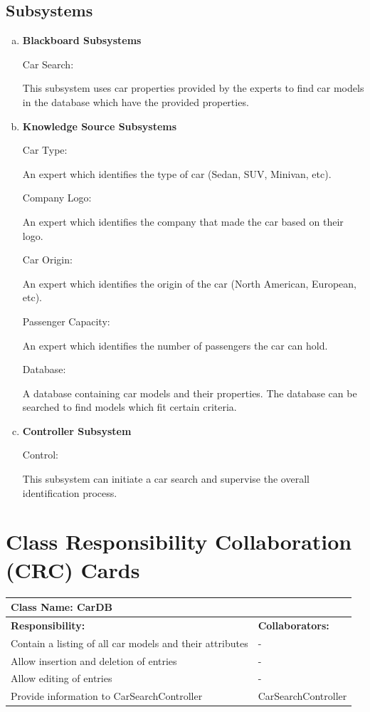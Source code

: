 \documentclass[12pt]{article}
\begin{document}
\subsection{Subsystems}
\label{sub:subsystems}
\begin{enumerate}[a)]
	\item {\textbf{Blackboard Subsystems}}
	\par Car Search:
	\par This subsystem uses car properties provided by the experts to find car models in the database which have the provided properties.
	\item {\textbf{Knowledge Source Subsystems}}
	\par Car Type:
	\par An expert which identifies the type of car (Sedan, SUV, Minivan, etc).
	\par Company Logo:
	\par An expert which identifies the company that made the car based on their logo.
	\par Car Origin:
	\par An expert which identifies the origin of the car (North American, European, etc).
	\par Passenger Capacity:
	\par An expert which identifies the number of passengers the car can hold.
	\par Database:
	\par A database containing car models and their properties. The database can be searched to find models which fit certain criteria.
	\item {\textbf{Controller Subsystem}}
	\par Control:
	\par This subsystem can initiate a car search and supervise the overall identification process.
\end{enumerate}


\section{Class Responsibility Collaboration (CRC) Cards}
\label{sec:class_responsibility_collaboration_crc_cards}

	\begin{table}[ht]
		\centering
		\begin{tabular}{|p{5cm}|p{5cm}|}
		\hline
		 \multicolumn{2}{|l|}{\textbf{Class Name:} CarDB} \\
		\hline
		\textbf{Responsibility:} & \textbf{Collaborators:} \\
		\hline
		Contain a listing of all car models and their attributes & -\\
		\hline
		Allow insertion and deletion of entries & -\\
		\hline
		Allow editing of entries & - \\
		\hline
		Provide information to CarSearchController & CarSearchController \\
		\hline
		\end{tabular}
	\end{table}
\end{document}
